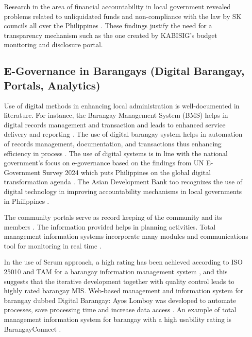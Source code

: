\hspace*{\parindent}Research in the area of financial accountability in local government revealed problems related to unliquidated funds and non-compliance with the law by SK councils all over the Philippines \cite{AW}. These findings justify the need for a transparency mechanism such as the one created by KABISIG's budget monitoring and disclosure portal.
\vspace{5mm}

\subsection{E-Governance in Barangays (Digital Barangay, Portals, Analytics)}

\hspace*{\parindent}Use of digital methods in enhancing local administration is well-documented in literature. For instance, the Barangay Management System (BMS) helps in digital records management and transaction and leads to enhanced service delivery and reporting \cite{D}. The use of digital barangay system helps in automation of records management, documentation, and transactions thus enhancing efficiency in process \cite{V}. The use of digital systems is in line with the national government's focus on e-governance based on the findings from UN E-Government Survey 2024 which puts Philippines on the global digital transformation agenda \cite{BA}. The Asian Development Bank too recognizes the use of digital technology in improving accountability mechanisms in local governments in Philippines \cite{F}.
\vspace{5mm}

\hspace*{\parindent}The community portals serve as record keeping of the community and its members \cite{D}. The information provided helps in planning activities. Total management information systems incorporate many modules and communications tool for monitoring in real time \cite{AM}.
\vspace{5mm}

\hspace*{\parindent}In the use of Scrum approach, a high rating has been achieved according to ISO 25010 and TAM for a barangay information management system \cite{AM}, and this suggests that the iterative development together with quality control leads to highly rated barangay MIS. Web-based management and information system for barangay dubbed Digital Barangay: Ayos Lomboy was developed to automate processes, save processing time and increase data access \cite{V}. An example of total management information system for barangay with a high usability rating is BarangayConnect \cite{AM}.
\vspace{5mm}

